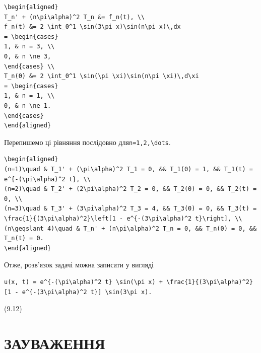 \documentclass[
  ukrainian,
]{article}
\begin{document}
\begin{verbatim}
\begin{aligned}
T_n' + (n\pi\alpha)^2 T_n &= f_n(t), \\
f_n(t) &= 2 \int_0^1 \sin(3\pi x)\sin(n\pi x)\,dx
= \begin{cases}
1, & n = 3, \\
0, & n \ne 3,
\end{cases} \\
T_n(0) &= 2 \int_0^1 \sin(\pi \xi)\sin(n\pi \xi)\,d\xi
= \begin{cases}
1, & n = 1, \\
0, & n \ne 1.
\end{cases}
\end{aligned}
\end{verbatim}

Перепишемо ці рівняння послідовно
для\texttt{n=1,2,\textbackslash{}dots}.

\begin{verbatim}
\begin{aligned}
(n=1)\quad & T_1' + (\pi\alpha)^2 T_1 = 0, && T_1(0) = 1, && T_1(t) = e^{-(\pi\alpha)^2 t}, \\
(n=2)\quad & T_2' + (2\pi\alpha)^2 T_2 = 0, && T_2(0) = 0, && T_2(t) = 0, \\
(n=3)\quad & T_3' + (3\pi\alpha)^2 T_3 = 4, && T_3(0) = 0, && T_3(t) = \frac{1}{(3\pi\alpha)^2}\left[1 - e^{-(3\pi\alpha)^2 t}\right], \\
(n\geqslant 4)\quad & T_n' + (n\pi\alpha)^2 T_n = 0, && T_n(0) = 0, && T_n(t) = 0.
\end{aligned}
\end{verbatim}

Отже, розв'язок задачі можна записати у вигляді

\begin{verbatim}
u(x, t) = e^{-(\pi\alpha)^2 t} \sin(\pi x) + \frac{1}{(3\pi\alpha)^2} [1 - e^{-(3\pi\alpha)^2 t}] \sin(3\pi x).
\end{verbatim}

(9.12)

\section{ЗАУВАЖЕННЯ}\label{ux437ux430ux443ux432ux430ux436ux435ux43dux43dux44f-2}
\end{document}
